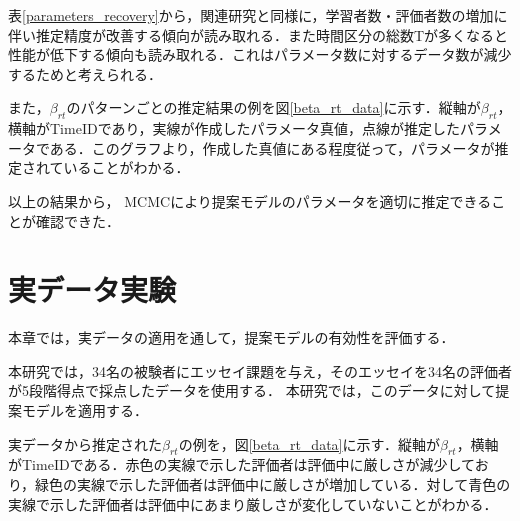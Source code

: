 \documentclass[dvipdfmx, twocolumn, a4paper]{hcresume}
\begin{document}
表\ref{parameters_recovery}から，関連研究と同様に，学習者数・評価者数の増加に伴い推定精度が改善する傾向が読み取れる．また時間区分の総数Tが多くなると性能が低下する傾向も読み取れる．これはパラメータ数に対するデータ数が減少するためと考えられる．

また，$\beta_{rt}$のパターンごとの推定結果の例を図\ref{beta_rt_data}に示す．縦軸が$\beta_{rt}$，横軸がTimeIDであり，実線が作成したパラメータ真値，点線が推定したパラメータである．このグラフより，作成した真値にある程度従って，パラメータが推定されていることがわかる．

以上の結果から， MCMCにより提案モデルのパラメータを適切に推定できることが確認できた．

\section{実データ実験}
本章では，実データの適用を通して，提案モデルの有効性を評価する．

本研究では，34名の被験者にエッセイ課題を与え，そのエッセイを34名の評価者が5段階得点で採点したデータを使用する．
本研究では，このデータに対して提案モデルを適用する．

実データから推定された$\beta_{rt}$の例を，図\ref{beta_rt_data}に示す．縦軸が$\beta_{rt}$，横軸がTimeIDである．赤色の実線で示した評価者は評価中に厳しさが減少しており，緑色の実線で示した評価者は評価中に厳しさが増加している．対して青色の実線で示した評価者は評価中にあまり厳しさが変化していないことがわかる．
\end{document}
